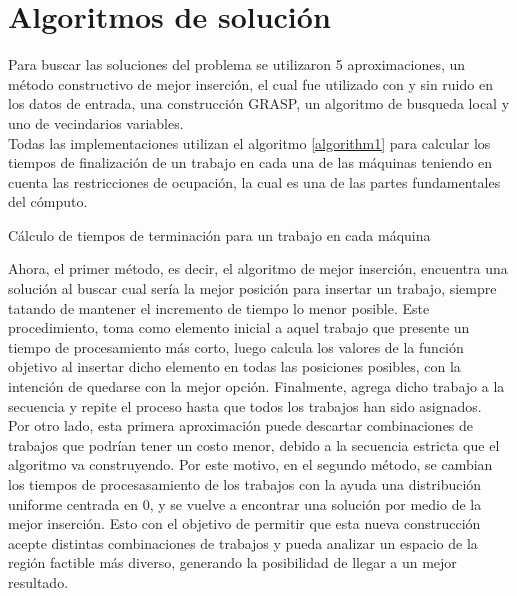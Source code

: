 \documentclass[10pt, twoside]{article}
\begin{document}
\section{Algoritmos de solución}

Para buscar las soluciones del problema se utilizaron 5 aproximaciones, un
método constructivo de mejor inserción, el cual fue utilizado con y sin
ruido en los datos de entrada, una construcción GRASP, un algoritmo de busqueda
local y uno de vecindarios variables.\\

Todas las implementaciones utilizan el algoritmo \ref{algorithm1} para calcular
los tiempos de finalización de un trabajo en cada una de las máquinas teniendo
en cuenta las restricciones de ocupación, la cual es una de las partes
fundamentales del cómputo.\\

\begin{algorithm}[H]
    \caption{Cálculo de tiempos de terminación para un trabajo en cada máquina}
    \label{algorithm1}
\end{algorithm}

\vspace{0.5cm}

Ahora, el primer método, es decir, el algoritmo de mejor inserción, encuentra
una solución al buscar cual sería la mejor posición para insertar un trabajo,
siempre tatando de mantener el incremento de tiempo lo menor posible. Este
procedimiento, toma como elemento inicial a aquel trabajo que presente un tiempo de
procesamiento más corto, luego calcula los valores de la función objetivo
al insertar dicho elemento en todas las posiciones posibles, con la intención
de quedarse con la mejor opción. Finalmente, agrega dicho trabajo a la
secuencia y repite el proceso hasta que todos los trabajos han sido
asignados.\\

Por otro lado, esta primera aproximación puede descartar combinaciones de
trabajos que podrían tener un costo menor, debido a la secuencia estricta que el
algoritmo va construyendo. Por este motivo, en el segundo método, se cambian los
tiempos de procesasamiento de los trabajos con la ayuda una distribución
uniforme centrada en 0, y se vuelve a encontrar una solución por medio de la
mejor inserción. Esto con el objetivo de permitir que esta nueva construcción
acepte distintas combinaciones de trabajos y pueda analizar un espacio de la
región factible más diverso, generando la posibilidad de llegar a un mejor
resultado.\\
\end{document}
